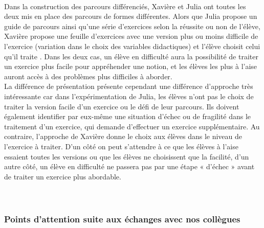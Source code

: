 \paragraph*{}Dans la construction des parcours différenciés, Xavière et Julia ont toutes les deux mis en place des parcours de formes différentes. Alors que Julia propose un guide de parcours ainsi qu'une série d'exercices selon la réussite ou non de l'élève, Xavière propose une feuille d'exercices avec une version plus ou moins difficile de l'exercice (variation dans le choix des variables didactiques) et l'élève choisit celui qu'il traite . Dans les deux cas, un élève en difficulté aura la possibilité de traiter un exercice plus facile pour appréhender une notion, et les élèves les plus à l'aise auront accès à des problèmes plus difficiles à aborder.\\
La différence de présentation présente cependant une différence d'approche très intéressante car dans l'expérimentation de Julia, les élèves n'ont pas le choix de traiter la version facile d'un exercice ou le défi de leur parcours. Ils doivent également identifier par eux-même une situation d'échec ou de fragilité dans le traitement d'un exercice, qui demande d'effectuer un exercice supplémentaire. Au contraire, l'approche de Xavière donne le choix aux élèves dans le niveau de l'exercice à traiter. D'un côté on peut s'attendre à ce que les élèves à l'aise essaient toutes les versions ou que les élèves ne choisissent que la facilité, d'un autre côté, un élève en difficulté ne passera pas par une étape « d'échec » avant de traiter un exercice plus abordable.
\paragraph*{}
\\
\subsubsection{Points d'attention suite aux échanges avec nos collègues}\label{retour_collegues}
